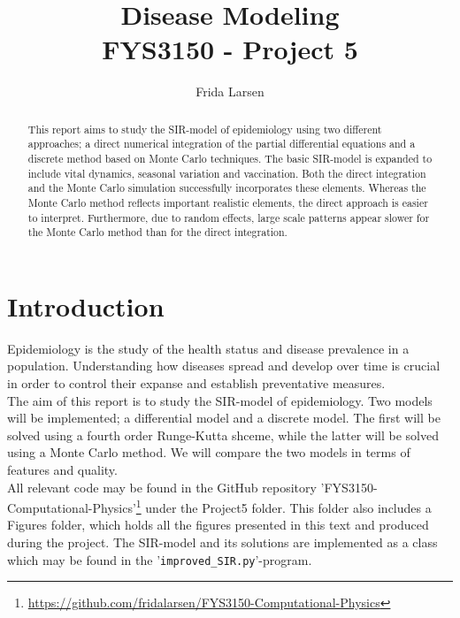 \documentclass[notitlepage, reprint, nofootinbib]{revtex4-1}
\begin{document}
\title{Disease Modeling \\[2mm] \normalsize{FYS3150 - Project 5}}
\author{Frida Larsen}

\begin{abstract}
This report aims to study the SIR-model of epidemiology using two different approaches; a direct numerical integration of the partial differential equations and a discrete method based on Monte Carlo techniques. The basic SIR-model is expanded to include vital dynamics, seasonal variation and vaccination. Both the direct integration and the Monte Carlo simulation successfully incorporates these elements. Whereas the Monte Carlo method reflects important realistic elements, the direct approach is easier to interpret. Furthermore, due to random effects, large scale patterns appear slower for the Monte Carlo method than for the direct integration. 
\end{abstract}

\maketitle

\section{Introduction}
Epidemiology is the study of the health status and disease prevalence in a population.\cite{Epidemiologi} Understanding how diseases spread and develop over time is crucial in order to control their expanse and establish preventative measures. \\[2mm]
The aim of this report is to study the SIR-model of epidemiology. Two models will be implemented; a differential model and a discrete model. The first will be solved using a fourth order Runge-Kutta shceme, while the latter will be solved using a Monte Carlo method. We will compare the two models in terms of features and quality.\\[2mm]
All relevant code may be found in the GitHub repository 'FYS3150-Computational-Physics'\footnote{\href{GitHub Repository}{https://github.com/fridalarsen/FYS3150-Computational-Physics}} under the Project5 folder. This folder also includes a Figures folder, which holds all the figures presented in this text and produced during the project. The SIR-model and its solutions are implemented as a class which may be found in the '\texttt{improved\_SIR.py}'-program.
\end{document}
